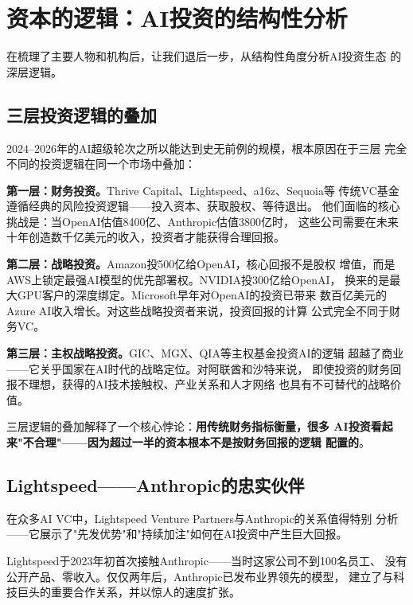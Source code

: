 \section{资本的逻辑：AI投资的结构性分析}
\label{sec:inv-analysis}

在梳理了主要人物和机构后，让我们退后一步，从结构性角度分析AI投资生态
的深层逻辑。

\subsection{三层投资逻辑的叠加}
\label{subsec:inv-three-layers}

2024--2026年的AI超级轮次之所以能达到史无前例的规模，根本原因在于三层
完全不同的投资逻辑在同一个市场中叠加：

\textbf{第一层：财务投资。}Thrive Capital、Lightspeed、a16z、Sequoia等
传统VC基金遵循经典的风险投资逻辑——投入资本、获取股权、等待退出。
他们面临的核心挑战是：当OpenAI估值8400亿、Anthropic估值3800亿时，
这些公司需要在未来十年创造数千亿美元的收入，投资者才能获得合理回报。

\textbf{第二层：战略投资。}Amazon投500亿给OpenAI，核心回报不是股权
增值，而是AWS上锁定最强AI模型的优先部署权。NVIDIA投300亿给OpenAI，
换来的是最大GPU客户的深度绑定。Microsoft早年对OpenAI的投资已带来
数百亿美元的Azure AI收入增长。对这些战略投资者来说，投资回报的计算
公式完全不同于财务VC。

\textbf{第三层：主权战略投资。}GIC、MGX、QIA等主权基金投资AI的逻辑
超越了商业——它关乎国家在AI时代的战略定位。对阿联酋和沙特来说，
即使投资的财务回报不理想，获得的AI技术接触权、产业关系和人才网络
也具有不可替代的战略价值。

三层逻辑的叠加解释了一个核心悖论：\textbf{用传统财务指标衡量，很多
AI投资看起来"不合理"——因为超过一半的资本根本不是按财务回报的逻辑
配置的}。

\subsection{Lightspeed——Anthropic的忠实伙伴}
\label{subsec:inv-lightspeed}

在众多AI VC中，Lightspeed Venture Partners与Anthropic的关系值得特别
分析——它展示了"先发优势"和"持续加注"如何在AI投资中产生巨大回报。

Lightspeed于2023年初首次接触Anthropic——当时这家公司不到100名员工、
没有公开产品、零收入。仅仅两年后，Anthropic已发布业界领先的模型，
建立了与科技巨头的重要合作关系，并以惊人的速度扩张。

